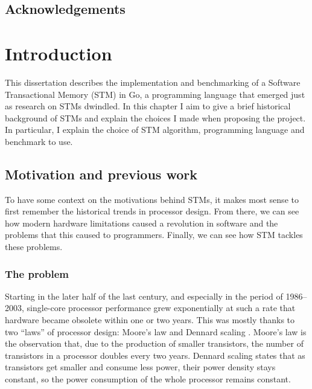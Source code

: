 \documentclass[12pt,a4paper,oneside,openright]{report}
\begin{document}
\pagestyle{plain} 

\tableofcontents

\listoffigures{}

\listoftables{}


\newpage

\section*{Acknowledgements}



\pagestyle{headings}


\chapter{Introduction}


This dissertation describes the implementation and benchmarking of a
Software Transactional Memory (STM) in Go, a programming language that
emerged just as research on STMs dwindled. In this chapter I aim to
give a brief historical background of STMs and explain the choices I
made when proposing the project. In particular, I explain the choice
of STM algorithm, programming language and benchmark to use.

\section{Motivation and previous work}
\label{sec:motivation}

To have some context on the motivations behind STMs, it makes most
sense to first remember the historical trends in processor
design. From there, we can see how modern hardware limitations caused
a revolution in software and the problems that this caused to
programmers. Finally, we can see how STM tackles these problems.

\subsection{The problem}
\label{sec:problem}

Starting in the later half of the last century, and especially in the
period of 1986--2003, single-core processor performance grew
exponentially at such a rate that hardware became obsolete within one
or two years. This was mostly thanks to two ``laws'' of processor
design: Moore's law \cite{MooreLaw} and Dennard scaling
\cite{DennardScaling}. Moore's law is the observation that, due to the
production of smaller transistors, the number of transistors in a
processor doubles every two years\footnotemark. Dennard scaling states
that as transistors get smaller and consume less power, their power
density stays constant, so the power consumption of the whole
processor remains constant.
\end{document}
